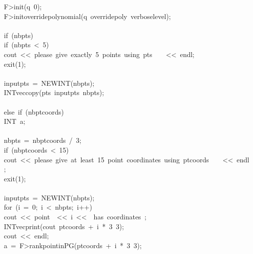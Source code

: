 \begin{tabbing}
\>F>init(q\ 0);\\[0pt]
\>F>initoverridepolynomial(q\ overridepoly\ verboselevel);\\[0pt]
\\[0pt]
\>if\ (nbpts)\ \\[0pt]
\>\>if\ (nbpts\ <\ 5)\ \\[0pt]
\>\>\>cout\ <<\ please\ give\ exactly\ 5\ points\ using\ pts\ <p1>\ \ <p5>\ <<\ endl;\\[0pt]
\>\>\>exit(1);\\[0pt]
\>\>\>\\[0pt]
\>\>inputpts\ =\ NEWINT(nbpts);\\[0pt]
\>\>INTveccopy(pts\ inputpts\ nbpts);\\[0pt]
\>\>\\[0pt]
\>else\ if\ (nbptcoords)\ \\[0pt]
\>\>INT\ a;\\[0pt]
\>\>\\[0pt]
\>\>nbpts\ =\ nbptcoords\ /\ 3;\\[0pt]
\>\>if\ (nbptcoords\ <\ 15)\ \\[0pt]
\>\>\>cout\ <<\ please\ give\ at\ least\ 15\ point\ coordinates\ using\ ptcoords\ <p1>\ \ <p15>\ <<\ endl;\\[0pt]
\>\>\>exit(1);\\[0pt]
\>\>\>\\[0pt]
\>\>inputpts\ =\ NEWINT(nbpts);\\[0pt]
\>\>for\ (i\ =\ 0;\ i\ <\ nbpts;\ i++)\ \\[0pt]
\>\>\>cout\ <<\ point\ \ <<\ i\ <<\ \ has\ coordinates\ ;\\[0pt]
\>\>\>INTvecprint(cout\ ptcoords\ +\ i\ *\ 3\ 3);\\[0pt]
\>\>\>cout\ <<\ endl;\\[0pt]
\>\>\>a\ =\ F>rankpointinPG(ptcoords\ +\ i\ *\ 3\ 3);\\[0pt]

\end{tabbing}
